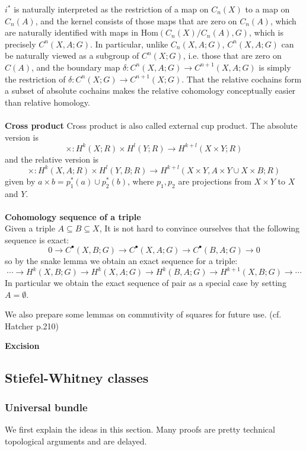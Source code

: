 \documentclass[12pt]{article}
\theoremstyle{plain}
\theoremstyle{definition}
\newcommand{\Hom}{\mathrm{Hom}}
\newcommand{\<}{\langle}
\renewcommand{\>}{\rangle}
\begin{document}
$i^*$ is naturally interpreted as the restriction of a map on $C_n(X)$ to a map on $C_n(A)$, and the kernel consists of those maps that are zero on $C_n(A)$, which are naturally identified with maps in $\Hom(C_n(X)/C_n(A), G)$, which is precisely $C^n(X, A; G)$. In particular, unlike $C_n(X, A; G)$, $C^n(X, A; G)$ can be naturally viewed as a subgroup of $C^n(X; G)$, i.e. those that are zero on $C(A)$, and the boundary map $\delta : C^n(X, A; G) \to C^{n+1}(X, A; G)$ is simply the restriction of $\delta : C^n(X; G) \to C^{n+1}(X; G)$. That the relative cochains form a subset of absolute cochains makes the relative cohomology conceptually easier than relative homology. \\\\
\textbf{Cross product}
Cross product is also called external cup product. The absolute version is 
$$ \times : H^k(X; R) \times H^l(Y; R) \to H^{k + l}(X \times Y; R) $$
and the relative version is 
$$ \times : H^k(X, A; R) \times H^l(Y, B; R) \to H^{k + l}(X \times Y, A \times Y \cup X \times B; R)$$
given by $a \times b = p_1^*(a) \cup p_2^*(b)$, where $p_1, p_2$ are projections from $X \times Y$ to $X$ and $Y$. \\\\
\textbf{Cohomology sequence of a triple}\\
Given a triple $A \subseteq B \subseteq X$, It is not hard to convince ourselves that the following sequence is exact:
$$ 0 \to C^\bullet (X, B; G) \to C^\bullet (X, A; G) \to C^\bullet(B, A; G) \to 0 $$
so by the snake lemma we obtain an exact sequence for a triple:
$$ \cdots \to H^k(X, B; G) \to H^k(X, A; G) \to H^k(B, A; G) \to H^{k + 1}(X, B; G) \to \cdots $$
In particular we obtain the exact sequence of pair as a special case by setting $A = \emptyset$. 

We also prepare some lemmas on commutivity of squares for future use. (cf. Hatcher p.210)

\textbf{Excision}



\subsection{Stiefel-Whitney classes}
\subsubsection{Universal bundle}
We first explain the ideas in this section. Many proofs are pretty technical topological arguments and are delayed. 
\end{document}
